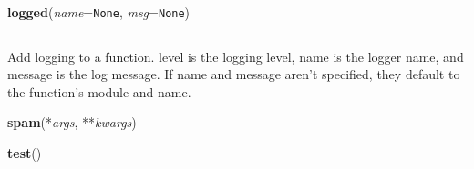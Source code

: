     \label{etude:utils:mylogging:logged}

    \vspace{0.5ex}

\hspace{.8\funcindent}\begin{boxedminipage}{\funcwidth}

    \raggedright \textbf{logged}(\textit{name}={\tt None}, \textit{msg}={\tt None})

    \vspace{-1.5ex}

    \rule{\textwidth}{0.5\fboxrule}
\setlength{\parskip}{2ex}
    Add logging to a function.  level is the logging level, name is the 
    logger name, and message is the log message.  If name and message 
    aren't specified, they default to the function's module and name.

\setlength{\parskip}{1ex}
    \end{boxedminipage}

    \label{etude:utils:mylogging:spam}

    \vspace{0.5ex}

\hspace{.8\funcindent}\begin{boxedminipage}{\funcwidth}

    \raggedright \textbf{spam}(*\textit{args}, **\textit{kwargs})

\setlength{\parskip}{2ex}
\setlength{\parskip}{1ex}
    \end{boxedminipage}

    \label{etude:utils:mylogging:test}

    \vspace{0.5ex}

\hspace{.8\funcindent}\begin{boxedminipage}{\funcwidth}

    \raggedright \textbf{test}()

\setlength{\parskip}{2ex}
\setlength{\parskip}{1ex}
    \end{boxedminipage}


